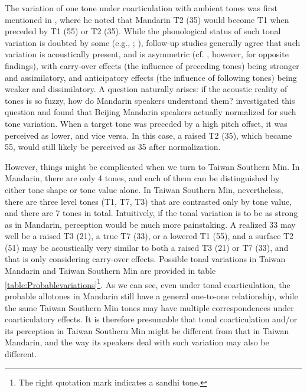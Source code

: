 The variation of one tone under coarticulation with ambient tones was first mentioned in \cite{Chao1968}, where he noted that Mandarin T2 (35) would become T1 when preceded by T1 (55) or T2 (35). While the phonological status of such tonal variation is doubted by some (e.g., \citealp{ShihSproat1992}; \citealp{Xu1994}), follow-up studies generally agree that such variation is acoustically present, and is asymmetric (cf. \citealp{Shen1990}, however, for opposite findings), with carry-over effects (the influence of preceding tones) being stronger and assimilatory, and anticipatory effects (the influence of following tones) being weaker and dissimilatory. A question naturally arises: if the acoustic reality of tones is so fuzzy, how do Mandarin speakers understand them? \cite{Xu1997} investigated this question and found that Beijing Mandarin speakers actually normalized for such tone variation. When a target tone was preceded by a high pitch offset, it was perceived as lower, and vice versa. In this case, a raised T2 (35), which became 55, would still likely be perceived as 35 after normalization.

However, things might be complicated when we turn to Taiwan Southern Min. In Mandarin, there are only 4 tones, and each of them can be distinguished by either tone shape or tone value alone. In Taiwan Southern Min, nevertheless, there are three level tones (T1, T7, T3) that are contrasted only by tone value, and there are 7 tones in total. Intuitively, if the tonal variation is to be as strong as in Mandarin, perception would be much more painstaking. A realized 33 may well be a raised T3 (21), a true T7 (33), or a lowered T1 (55), and a surface T2 (51) may be acoustically very similar to both a raised T3 (21) or T7 (33), and that is only considering carry-over effects. Possible tonal variations in Taiwan Mandarin and Taiwan Southern Min are provided in table \ref{table:Probablevariations}\footnote{The right quotation mark indicates a sandhi tone.}. As we can see, even under tonal coarticulation, the probable allotones in Mandarin still have a general one-to-one relationship, while the same Taiwan Southern Min tones may have multiple correspondences under coarticulatory effects. It is therefore presumable that tonal coarticulation and/or its perception in Taiwan Southern Min might be different from that in Taiwan Mandarin, and the way its speakers deal with such variation may also be different.

